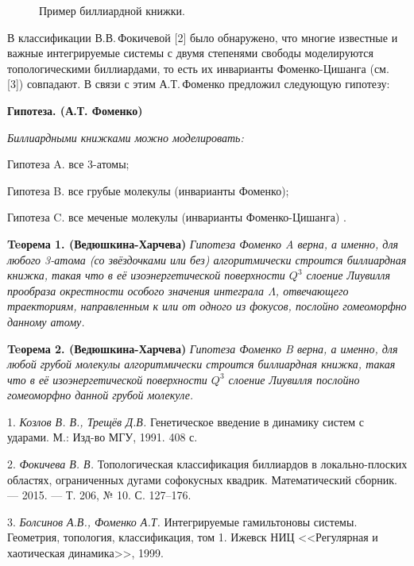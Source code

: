 \begin{figure}[h!]
	\caption{Пример биллиардной книжки. \label{3obl}}
\end{figure}

В классификации В.В.\,Фокичевой [2]  было обнаружено, что многие известные и важные интегрируемые системы с двумя степенями свободы моделируются топологическими  биллиардами, то есть их инварианты Фоменко-Цишанга (см. [3]) совпадают. В связи с этим А.Т.\,Фоменко предложил следующую гипотезу:

\textbf{Гипотеза. (А.Т. Фоменко)}
{\it Биллиардными книжками можно моделировать:

	Гипотеза A. все 3-атомы;

	Гипотеза B. все грубые молекулы (инварианты Фоменко);

	Гипотеза C. все меченые молекулы (инварианты Фоменко-Цишанга) .
}

\textbf{Teорема 1. (Ведюшкина-Харчева)}  {\it Гипотеза Фоменко A верна, а именно, для любого 3-атома (со звёздочками или без) алгоритмически строится биллиардная книжка, такая что в её изоэнергетической поверхности $ Q^3 $ слоение Лиувилля прообраза окрестности особого значения интеграла $ \Lambda $, отвечающего траекториям, направленным к или от одного из фокусов, послойно гомеоморфно данному атому.}

\textbf{Teорема 2. (Ведюшкина-Харчева)}  {\it Гипотеза Фоменко B верна, а именно, для любой грубой молекулы алгоритмически строится биллиардная книжка, такая что в её изоэнергетической поверхности $ Q^3 $ слоение Лиувилля послойно гомеоморфно данной грубой молекуле.}

\litlist

1. {\it  Козлов В. В., Трещёв Д.В.} Генетическое введение в динамику систем с ударами. М.:  Изд-во МГУ, 1991. 408 с.

2. {\it Фокичева В. В.} Топологическая классификация биллиардов в локально-плоских областях, ограниченных дугами софокусных квадрик. Математический сборник. — 2015. — Т. 206, № 10. С. 127–176.

3. {\it Болсинов А.В., Фоменко А.Т.} Интегрируемые гамильтоновы системы. Геометрия, топология, классификация, том 1. Ижевск НИЦ <<Регулярная и хаотическая динамика>>, 1999.
